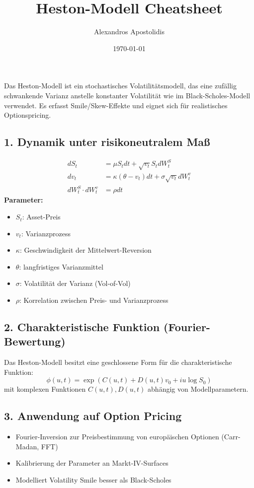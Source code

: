 \documentclass[a4paper,12pt]{article}
\title{Heston-Modell Cheatsheet}
\author{Alexandros Apostolidis}
\date{\today}
\begin{document}
\maketitle


\begin{tcolorbox}[title=Grundidee]
Das Heston-Modell ist ein stochastisches Volatilitätsmodell, das eine zufällig schwankende Varianz anstelle konstanter Volatilität wie im Black-Scholes-Modell verwendet. Es erfasst Smile/Skew-Effekte und eignet sich für realistisches Optionspricing.
\end{tcolorbox}

\subsection*{1. Dynamik unter risikoneutralem Maß}
\[
  \begin{aligned}
    dS_t &= \mu S_t dt + \sqrt{v_t} S_t dW_t^S \\
    dv_t &= \kappa(\theta - v_t)dt + \sigma \sqrt{v_t} dW_t^v \\
    dW_t^S \cdot dW_t^v &= \rho dt
  \end{aligned}
\]
\textbf{Parameter:}
\begin{itemize}
  \item $S_t$: Asset-Preis
  \item $v_t$: Varianzprozess
  \item $\kappa$: Geschwindigkeit der Mittelwert-Reversion
  \item $\theta$: langfristiges Varianzmittel
  \item $\sigma$: Volatilität der Varianz (Vol-of-Vol)
  \item $\rho$: Korrelation zwischen Preis- und Varianzprozess
\end{itemize}

\subsection*{2. Charakteristische Funktion (Fourier-Bewertung)}
Das Heston-Modell besitzt eine geschlossene Form für die charakteristische Funktion:
\[
  \phi(u, t) = \exp(C(u, t) + D(u, t) v_0 + i u \log S_0)
\]
mit komplexen Funktionen $C(u,t), D(u,t)$ abhängig von Modellparametern.

\subsection*{3. Anwendung auf Option Pricing}
\begin{itemize}
  \item Fourier-Inversion zur Preisbestimmung von europäischen Optionen (Carr-Madan, FFT)
  \item Kalibrierung der Parameter an Markt-IV-Surfaces
  \item Modelliert Volatility Smile besser als Black-Scholes
\end{itemize}
\end{document}
